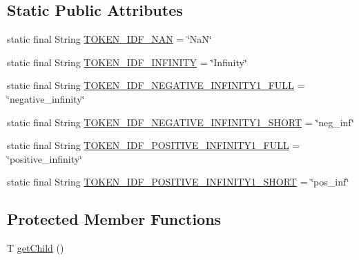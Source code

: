 \subsection*{Static Public Attributes}
\begin{DoxyCompactItemize}
\item 
static final String \hyperlink{classgov_1_1nasa_1_1jpf_1_1inspector_1_1server_1_1expression_1_1expressions_1_1_expression_state_value_name_a60b9cad6eaa4f82de36390a081c8564f}{T\+O\+K\+E\+N\+\_\+\+I\+D\+F\+\_\+\+N\+AN} = \char`\"{}NaN\char`\"{}
\item 
static final String \hyperlink{classgov_1_1nasa_1_1jpf_1_1inspector_1_1server_1_1expression_1_1expressions_1_1_expression_state_value_name_a52184205cd89e72676584c0f3ef6aa9c}{T\+O\+K\+E\+N\+\_\+\+I\+D\+F\+\_\+\+I\+N\+F\+I\+N\+I\+TY} = \char`\"{}Infinity\char`\"{}
\item 
static final String \hyperlink{classgov_1_1nasa_1_1jpf_1_1inspector_1_1server_1_1expression_1_1expressions_1_1_expression_state_value_name_af1f821920a54160484bb0cbe95bfb802}{T\+O\+K\+E\+N\+\_\+\+I\+D\+F\+\_\+\+N\+E\+G\+A\+T\+I\+V\+E\+\_\+\+I\+N\+F\+I\+N\+I\+T\+Y1\+\_\+\+F\+U\+LL} = \char`\"{}negative\+\_\+infinity\char`\"{}
\item 
static final String \hyperlink{classgov_1_1nasa_1_1jpf_1_1inspector_1_1server_1_1expression_1_1expressions_1_1_expression_state_value_name_a8cc1388ff14522512a25789a8b5c85d5}{T\+O\+K\+E\+N\+\_\+\+I\+D\+F\+\_\+\+N\+E\+G\+A\+T\+I\+V\+E\+\_\+\+I\+N\+F\+I\+N\+I\+T\+Y1\+\_\+\+S\+H\+O\+RT} = \char`\"{}neg\+\_\+inf\char`\"{}
\item 
static final String \hyperlink{classgov_1_1nasa_1_1jpf_1_1inspector_1_1server_1_1expression_1_1expressions_1_1_expression_state_value_name_a5e99cc072b02b6bb4be6e8179eae5d9b}{T\+O\+K\+E\+N\+\_\+\+I\+D\+F\+\_\+\+P\+O\+S\+I\+T\+I\+V\+E\+\_\+\+I\+N\+F\+I\+N\+I\+T\+Y1\+\_\+\+F\+U\+LL} = \char`\"{}positive\+\_\+infinity\char`\"{}
\item 
static final String \hyperlink{classgov_1_1nasa_1_1jpf_1_1inspector_1_1server_1_1expression_1_1expressions_1_1_expression_state_value_name_a716a95d43a0f36be72d6186df40131cb}{T\+O\+K\+E\+N\+\_\+\+I\+D\+F\+\_\+\+P\+O\+S\+I\+T\+I\+V\+E\+\_\+\+I\+N\+F\+I\+N\+I\+T\+Y1\+\_\+\+S\+H\+O\+RT} = \char`\"{}pos\+\_\+inf\char`\"{}
\end{DoxyCompactItemize}
\subsection*{Protected Member Functions}
\begin{DoxyCompactItemize}
\item 
T \hyperlink{classgov_1_1nasa_1_1jpf_1_1inspector_1_1server_1_1expression_1_1_expression_state_unary_operator_a150bac338d6557f79ca185d3f6ad6e06}{get\+Child} ()
\end{DoxyCompactItemize}
